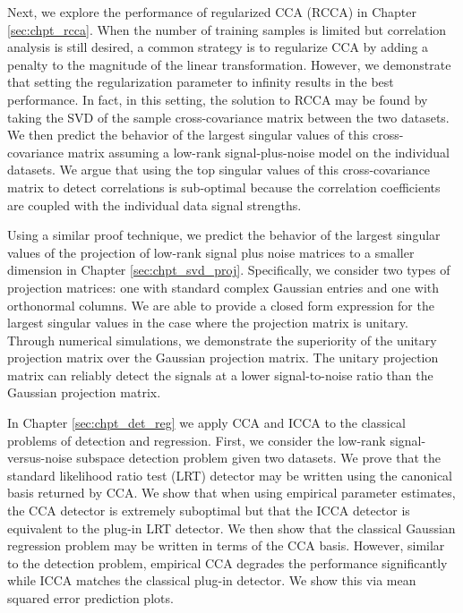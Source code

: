 Next, we explore the performance of regularized CCA (RCCA) in Chapter
\ref{sec:chpt_rcca}. When the number of training samples is limited but correlation
analysis is still desired, a common strategy is to regularize CCA by adding a penalty to
the magnitude of the linear transformation. However, we demonstrate that setting the
regularization parameter to infinity results in the best performance. In fact, in this
setting, the solution to RCCA may be found by taking the SVD of the sample
cross-covariance matrix between the two datasets. We then predict the behavior of the
largest singular values of this cross-covariance matrix assuming a low-rank
signal-plus-noise model on the individual datasets. We argue that using the top singular
values of this cross-covariance matrix to detect correlations is sub-optimal because the
correlation coefficients are coupled with the individual data signal strengths.

Using a similar proof technique, we predict the behavior of the largest singular values of
the projection of low-rank signal plus noise matrices to a smaller dimension in Chapter
\ref{sec:chpt_svd_proj}. Specifically, we consider two types of projection matrices: one
with standard complex Gaussian entries and one with orthonormal columns. We are able to
provide a closed form expression for the largest singular values in the case where the
projection matrix is unitary. Through numerical simulations, we demonstrate the
superiority of the unitary projection matrix over the Gaussian projection matrix. The
unitary projection matrix can reliably detect the signals at a lower signal-to-noise ratio
than the Gaussian projection matrix. 

In Chapter \ref{sec:chpt_det_reg} we apply CCA and ICCA to the classical problems of
detection and regression. First, we consider the low-rank signal-versus-noise subspace
detection problem given two datasets. We prove that the standard likelihood ratio test
(LRT) detector may be written using the canonical basis returned by CCA. We show that when
using empirical parameter estimates, the CCA detector is extremely suboptimal but that the
ICCA detector is equivalent to the plug-in LRT detector. We then show that the classical
Gaussian regression problem may be written in terms of the CCA basis. However, similar to
the detection problem, empirical CCA degrades the performance significantly while ICCA
matches the classical plug-in detector. We show this via mean squared error prediction
plots.


